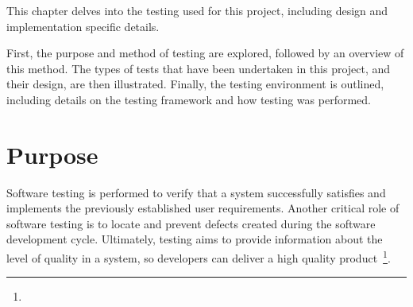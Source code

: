 This chapter delves into the testing used for this project, including design and implementation specific details.

First, the purpose and method of testing are explored, followed by an overview of this method. The types of tests that have been undertaken in this project, and their design, are then illustrated. Finally, the testing environment is outlined, including details on the testing framework and how testing was performed.

\section{Purpose} {
\label{sec:testing_purpose}

	Software testing is performed to verify that a system successfully satisfies and implements the previously established user requirements. Another critical role of software testing is to locate and prevent defects created during the software development cycle. Ultimately, testing aims to provide information about the level of quality in a system, so developers can deliver a high quality product~\footnote{}.

}

